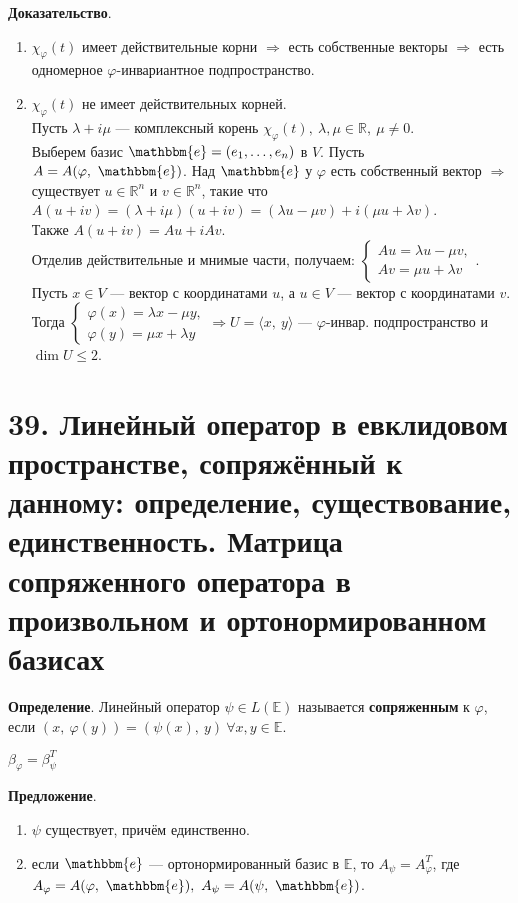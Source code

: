 \documentclass[a4paper, 12pt]{article}
\newcommand{\E}{\mathbb{E}}
\newcommand{\R}{\mathbb{R}}
\newcommand{\me}{\mathbbm{e}}
\begin{document}
\textbf{Доказательство}.
\vspace{-3mm}
\begin{enumerate}
    \itemsep=0em
    \item $\chi_\varphi(t)$ имеет действительные корни $\Rightarrow$ есть собственные векторы $\Rightarrow$ есть одномерное $\varphi$-инвариантное подпространство.
    \item $\chi_\varphi(t)$ не имеет действительных корней. \\
    Пусть $\lambda + i\mu$ --- комплексный корень $\chi_\varphi(t),\ \lambda, \mu \in \R,\ \mu \neq 0$. \\
    Выберем базис $\me = (e_1, \ldots, e_n)$ в $V$. Пусть $A = A(\varphi,\ \me)$. Над $\me$ у $\varphi$ есть собственный вектор $\Rightarrow$ существует $u \in \R^n$ и $v \in \R^n$, такие что $A(u + iv) = (\lambda + i\mu)(u + iv) = (\lambda u - \mu v) + i(\mu u + \lambda v)$. \\
    Также $A(u + iv) = Au + iAv$. \\
    Отделив действительные и мнимые части, получаем: $\begin{cases*}
    Au = \lambda u - \mu v, \\
    Av = \mu u + \lambda v
    \end{cases*}$. \\
    Пусть $x \in V$ --- вектор с координатами $u$, а $u \in V$ --- вектор с координатами $v$. \\
    Тогда $\begin{cases*}
    \varphi(x) = \lambda x - \mu y, \\
    \varphi(y) = \mu x + \lambda y
    \end{cases*} \Rightarrow U = \langle x,\ y \rangle$ --- $\varphi$-инвар. подпространство и $\dim U \leqslant 2$.
\end{enumerate}

\section*{39. Линейный оператор в евклидовом пространстве, сопряжённый к данному: определение, существование, единственность. Матрица сопряженного оператора в произвольном и ортонормированном базисах}
\textbf{Определение}. Линейный оператор $\psi \in L(\E)$ называется \textbf{сопряженным} к $\varphi$, если $(x,\ \varphi(y)) = (\psi(x),\ y)\ \forall x, y \in \E$.

$\beta_\varphi = \beta_\psi^T$

\textbf{Предложение}.
\vspace{-3mm}
\begin{enumerate}
    \itemsep=0em
    \item $\psi$ существует, причём единственно.
    \item если $\me$ --- ортонормированный базис в $\E$, то $A_\psi = A_\varphi^T$, где $A_\varphi = A(\varphi,\ \me),\ A_\psi = A(\psi,\ \me)$.
\end{enumerate}
\end{document}
